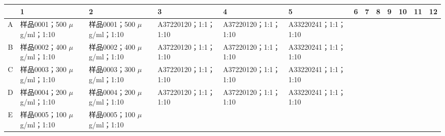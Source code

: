 \documentclass[UTF8,10pt,a4paper,fontset=fandol]{ctexart}
\newcommand{\fieldvalue}[1]{#1}
\begin{document}
\begin{center}
\scriptsize
\begin{tabular}{c|p{1.25cm}|p{1.25cm}|p{1.25cm}|p{1.25cm}|p{1.25cm}|p{1.25cm}|p{1.25cm}|p{1.25cm}|p{1.25cm}|p{1.25cm}|p{1.25cm}|p{1.25cm}}
 & 1 & 2 & 3 & 4 & 5 & 6 & 7 & 8 & 9 & 10 & 11 & 12\\ \hline
A &
\fieldvalue{样品0001；500 $\mu$g/ml；1:10} &
\fieldvalue{样品0001；500 $\mu$g/ml；1:10} &
\fieldvalue{A37220120；1:1；1:10} &
\fieldvalue{A37220120；1:1；1:10} &
\fieldvalue{A33220241；1:1；1:10} & & & & & & & \\ \hline
B &
\fieldvalue{样品0002；400 $\mu$g/ml；1:10} &
\fieldvalue{样品0002；400 $\mu$g/ml；1:10} &
\fieldvalue{A37220120；1:1；1:10} &
\fieldvalue{A37220120；1:1；1:10} &
\fieldvalue{A33220241；1:1；1:10} & & & & & & & \\ \hline
C &
\fieldvalue{样品0003；300 $\mu$g/ml；1:10} &
\fieldvalue{样品0003；300 $\mu$g/ml；1:10} &
\fieldvalue{A37220120；1:1；1:10} &
\fieldvalue{A37220120；1:1；1:10} &
\fieldvalue{A33220241；1:1；1:10} & & & & & & & \\ \hline
D &
\fieldvalue{样品0004；200 $\mu$g/ml；1:10} &
\fieldvalue{样品0004；200 $\mu$g/ml；1:10} &
\fieldvalue{A37220120；1:1；1:10} &
\fieldvalue{A37220120；1:1；1:10} &
\fieldvalue{A33220241；1:1；1:10} & & & & & & & \\ \hline
E &
\fieldvalue{样品0005；100 $\mu$g/ml；1:10} &
\fieldvalue{样品0005；100 $\mu$g/ml；1:10} &

\end{tabular}
\end{center}
\end{document}
